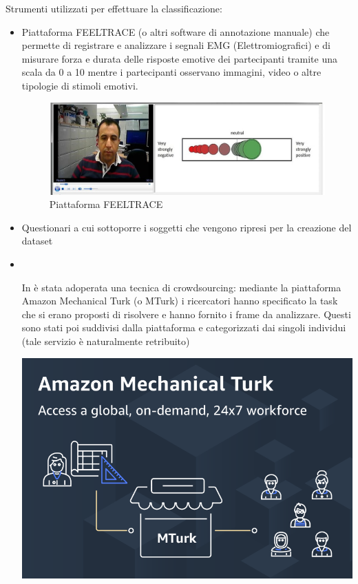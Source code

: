 Strumenti utilizzati per effettuare la classificazione:
\begin{itemize}
    \item Piattaforma FEELTRACE (o altri software di annotazione manuale) che permette di registrare e analizzare i segnali EMG (Elettromiografici) e di misurare forza e durata delle risposte emotive dei partecipanti tramite una scala da 0 a 10 mentre i partecipanti osservano immagini, video o altre tipologie di stimoli emotivi. \cite{AFEWVAdatabaseInTheWild}
    \begin{figure}[h]
        \centering    
            \includegraphics[width=0.5\linewidth]{images/11.jpg}
            \caption{Piattaforma FEELTRACE}
    \end{figure}
    \item Questionari a cui sottoporre i soggetti che vengono ripresi per la creazione del dataset
        \item \mbox{}\\[-\baselineskip]
        \begin{minipage}[t]{0.6\textwidth}
            In \cite{DAiSEE} è stata adoperata una tecnica di crowdsourcing: mediante la piattaforma Amazon Mechanical Turk (o MTurk) i ricercatori hanno specificato la task che si erano proposti di risolvere e hanno fornito i frame da analizzare. Questi sono stati poi suddivisi dalla piattaforma e categorizzati dai singoli individui (tale servizio è naturalmente retribuito)
        \end{minipage}\hfill
        \begin{minipage}[t]{0.3\textwidth}
            \centering
            \vspace{0pt}
            \includegraphics[width=\textwidth]{images/12.png}
        \end{minipage}
\end{itemize}


